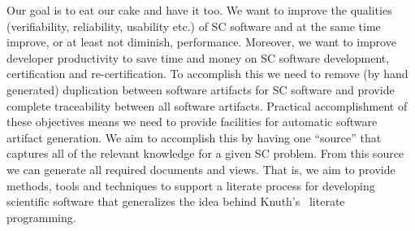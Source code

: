 \documentclass{sig-alternate-05-2015}
\begin{document}


Our goal is to eat our cake and have it too.  We want to improve the qualities
(verifiability, reliability, usability etc.) of SC software and at the same time
improve, or at least not diminish, performance.  Moreover, we want to improve
developer productivity to save time and money on SC software development,
certification and re-certification.  To accomplish this we need to remove (by
hand generated) duplication between software artifacts for SC software
\cite{WilsonEtAl2013} and provide complete traceability between all software
artifacts.  Practical accomplishment of these objectives means we need to
provide facilities for automatic software artifact generation.  We aim to
accomplish this by having one ``source'' that captures all of the relevant
knowledge for a given SC problem.  From this source we can generate all required
documents and views.  That is, we aim to provide methods, tools and techniques
to support a literate process for developing scientific software that
generalizes the idea behind Knuth's~\cite{Knuth1984} literate programming.
\end{document}
